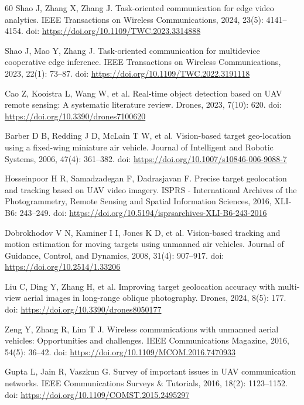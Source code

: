 \documentclass[fleqn]{VRIH2025}
\begin{document}
\begin{thebibliography}{60}
Shao J, Zhang X, Zhang J. Task-oriented communication for edge video analytics. IEEE Transactions on Wireless Communications, 2024, 23(5): 4141--4154. doi: \url{https://doi.org/10.1109/TWC.2023.3314888}

Shao J, Mao Y, Zhang J. Task-oriented communication for multidevice cooperative edge inference. IEEE Transactions on Wireless Communications, 2023, 22(1): 73--87. doi: \url{https://doi.org/10.1109/TWC.2022.3191118}

Cao Z, Kooistra L, Wang W, et al. Real-time object detection based on UAV remote sensing: A systematic literature review. Drones, 2023, 7(10): 620. doi: \url{https://doi.org/10.3390/drones7100620}

Barber D B, Redding J D, McLain T W, et al. Vision-based target geo-location using a fixed-wing miniature air vehicle. Journal of Intelligent and Robotic Systems, 2006, 47(4): 361--382. doi: \url{https://doi.org/10.1007/s10846-006-9088-7}

Hosseinpoor H R, Samadzadegan F, Dadrasjavan F. Precise target geolocation and tracking based on UAV video imagery. ISPRS - International Archives of the Photogrammetry, Remote Sensing and Spatial Information Sciences, 2016, XLI-B6: 243--249. doi: \url{https://doi.org/10.5194/isprsarchives-XLI-B6-243-2016}

Dobrokhodov V N, Kaminer I I, Jones K D, et al. Vision-based tracking and motion estimation for moving targets using unmanned air vehicles. Journal of Guidance, Control, and Dynamics, 2008, 31(4): 907--917. doi: \url{https://doi.org/10.2514/1.33206}

Liu C, Ding Y, Zhang H, et al. Improving target geolocation accuracy with multi-view aerial images in long-range oblique photography. Drones, 2024, 8(5): 177. doi: \url{https://doi.org/10.3390/drones8050177}

Zeng Y, Zhang R, Lim T J. Wireless communications with unmanned aerial vehicles: Opportunities and challenges. IEEE Communications Magazine, 2016, 54(5): 36--42. doi: \url{https://doi.org/10.1109/MCOM.2016.7470933}

Gupta L, Jain R, Vaszkun G. Survey of important issues in UAV communication networks. IEEE Communications Surveys \& Tutorials, 2016, 18(2): 1123--1152. doi: \url{https://doi.org/10.1109/COMST.2015.2495297}


\end{thebibliography}
\end{document}
